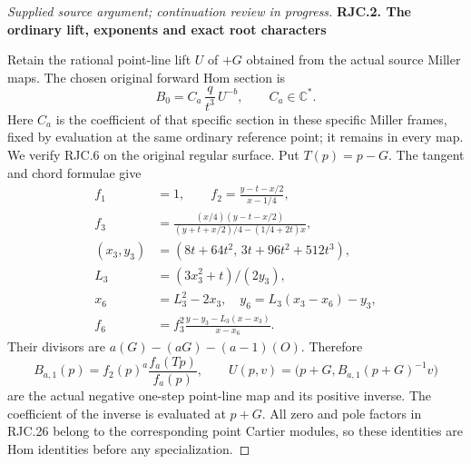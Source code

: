 \begin{proof}[Supplied source argument; continuation review in progress]
\par

\medskip\noindent\textbf{RJC.2. The ordinary lift, exponents and exact root characters}

\par\nobreak

Retain the rational point-line lift \(U\) of \(+G\) obtained from the
actual source Miller maps. The chosen original forward Hom section is
\[
 B_0=C_a\,\frac{q}{t^3}\,U^{-b},\qquad C_a\in\mathbb C^*.             \tag{RJC.6}
\]
Here \(C_a\) is the coefficient of that specific section in these
specific Miller frames, fixed by evaluation at the same ordinary
reference point; it remains in every map. We verify RJC.6 on the
original regular surface. Put \(T(p)=p-G\). The tangent and chord
formulae give
\[
 \begin{split}
 f_1&=1,\qquad
 f_2=\frac{y-t-x/2}{x-1/4},\\
 f_3&=\frac{(x/4)(y-t-x/2)}
 {(y+t+x/2)/4-(1/4+2t)x},\\
 (x_3,y_3)&=(8t+64t^2,\,3t+96t^2+512t^3),\\
 L_3&=(3x_3^2+t)/(2y_3),\\
 x_6&=L_3^2-2x_3,\quad y_6=L_3(x_3-x_6)-y_3,\\
 f_6&=f_3^2\frac{y-y_3-L_3(x-x_3)}{x-x_6}.
 \end{split}
 \tag{RJC.26}
\]
Their divisors are \(a(G)-(aG)-(a-1)(O)\). Therefore
\[
 B_{a,1}(p)=f_2(p)^a\frac{f_a(Tp)}{f_a(p)},\qquad
 U(p,v)=\bigl(p+G,B_{a,1}(p+G)^{-1}v\bigr)
 \tag{RJC.27}
\]
are the actual negative one-step point-line map and its positive
inverse. The coefficient of the inverse is evaluated at \(p+G\).
All zero and pole factors in RJC.26 belong to the corresponding
point Cartier modules, so these identities are Hom identities
before any specialization.


\end{proof}
